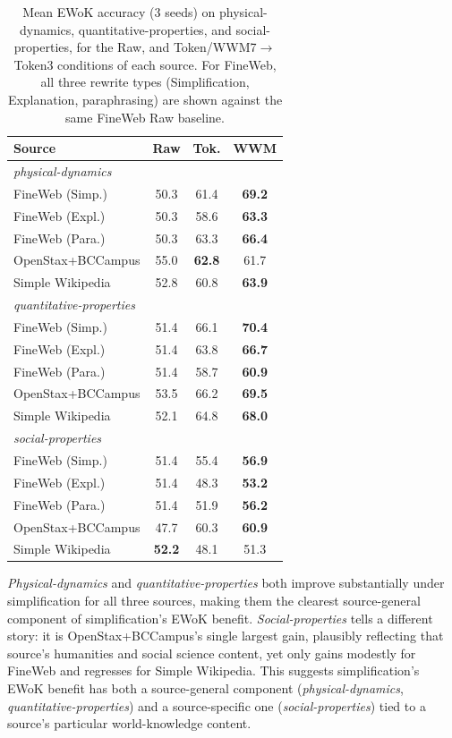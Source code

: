 \documentclass[11pt]{article}
\begin{document}
\begin{table}[t]
\centering
\footnotesize
\setlength{\tabcolsep}{2.5pt}
\begin{tabular}{lccc}
\toprule
\textbf{Source} & \textbf{Raw} & \textbf{Tok.} & \textbf{WWM} \\
\midrule
\multicolumn{4}{l}{\emph{physical-dynamics}} \\
FineWeb (Simp.)    & 50.3 & 61.4 & \textbf{69.2} \\
FineWeb (Expl.)    & 50.3 & 58.6 & \textbf{63.3} \\
FineWeb (Para.)    & 50.3 & 63.3 & \textbf{66.4} \\
OpenStax+BCCampus  & 55.0 & \textbf{62.8} & 61.7 \\
Simple Wikipedia   & 52.8 & 60.8 & \textbf{63.9} \\
\midrule
\multicolumn{4}{l}{\emph{quantitative-properties}} \\
FineWeb (Simp.)    & 51.4 & 66.1 & \textbf{70.4} \\
FineWeb (Expl.)    & 51.4 & 63.8 & \textbf{66.7} \\
FineWeb (Para.)    & 51.4 & 58.7 & \textbf{60.9} \\
OpenStax+BCCampus  & 53.5 & 66.2 & \textbf{69.5} \\
Simple Wikipedia   & 52.1 & 64.8 & \textbf{68.0} \\
\midrule
\multicolumn{4}{l}{\emph{social-properties}} \\
FineWeb (Simp.)    & 51.4 & 55.4 & \textbf{56.9} \\
FineWeb (Expl.)    & 51.4 & 48.3 & \textbf{53.2} \\
FineWeb (Para.)    & 51.4 & 51.9 & \textbf{56.2} \\
OpenStax+BCCampus  & 47.7 & 60.3 & \textbf{60.9} \\
Simple Wikipedia   & \textbf{52.2} & 48.1 & 51.3 \\
\bottomrule
\end{tabular}
\caption{Mean EWoK accuracy (3 seeds) on physical-dynamics, quantitative-properties, and social-properties, for the Raw, and Token/WWM7$\to$Token3 conditions of each source. For FineWeb, all three rewrite types (Simplification, Explanation, paraphrasing) are shown against the same FineWeb Raw baseline.}
\label{tab:ewok-subitem}
\end{table}


\textit{Physical-dynamics} and \textit{quantitative-properties} both improve substantially under simplification for all three sources, making them the clearest source-general component of simplification's EWoK benefit. \textit{Social-properties} tells a different story: it is OpenStax+BCCampus's single largest gain, plausibly reflecting that source's humanities and social science content, yet only gains modestly for FineWeb and regresses for Simple Wikipedia. This suggests simplification's EWoK benefit has both a source-general component (\textit{physical-dynamics}, \textit{quantitative-properties}) and a source-specific one (\textit{social-properties}) tied to a source's particular world-knowledge content.
\end{document}
